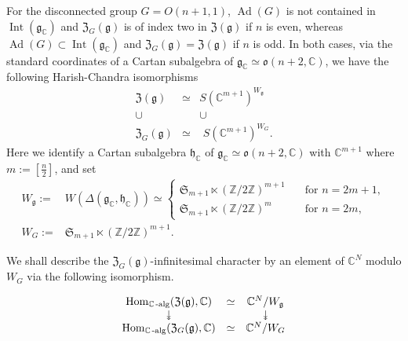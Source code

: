 For the disconnected group $G=O(n+1,1)$, 
 ${\operatorname{Ad}}(G)$ is not contained in ${\operatorname{Int}}({\mathfrak{g}}_{{\mathbb{C}}})$
 and ${\mathfrak{Z}}_G({\mathfrak{g}})$ is of index two in 
 ${\mathfrak{Z}}({\mathfrak{g}})$
if $n$ is even, 
 whereas ${\operatorname{Ad}}(G) \subset {\operatorname{Int}}({\mathfrak{g}}_{{\mathbb{C}}})$ and ${\mathfrak{Z}}_G({\mathfrak{g}})={\mathfrak{Z}}({\mathfrak{g}})$
 if $n$ is odd.  
In both cases,
 via the standard coordinates
 of a Cartan subalgebra of ${\mathfrak{g}}_{{\mathbb{C}}} \simeq {\mathfrak{o}}
(n+2,{{\mathbb{C}}})$, 
 we have the following
 Harish-Chandra isomorphisms
\begin{equation*}
\begin{array}{ccc}
   {\mathfrak{Z}}({\mathfrak{g}})
   & \simeq
   & S({{\mathbb{C}}}^{m+1})^{W_{\mathfrak{g}}}
\\
   \cup 
   & 
   & \cup
\\
  {\mathfrak{Z}}_G({\mathfrak{g}})
   & \simeq
   &\,\, S({{\mathbb{C}}}^{m+1})^{W_G}.  
\end{array}
\end{equation*}
Here  we identify a Cartan subalgebra ${\mathfrak{h}}_{{\mathbb{C}}}$
 of ${\mathfrak{g}}_{{\mathbb{C}}}\simeq {\mathfrak{o}}(n+2,{\mathbb{C}})$
 with ${{\mathbb{C}}}^{m+1}$
 where $m:=[\frac n 2]$, 
 and set 
\begin{align*}
W_{\mathfrak{g}}
:=& W(\Delta({\mathfrak{g}}_{\mathbb{C}},{\mathfrak{h}}_{\mathbb{C}}))
\simeq
\begin{cases}
{\mathfrak{S}}_{m+1} \ltimes ({\mathbb{Z}}/2 {\mathbb{Z}})^{m+1}
\quad
&\text{for $n=2m+1$}, 
\\
{\mathfrak{S}}_{m+1} \ltimes ({\mathbb{Z}}/2 {\mathbb{Z}})^{m}
\quad
&\text{for $n=2m$}, 
\end{cases}
\\
W_G:=& {\mathfrak{S}}_{m+1} \ltimes ({\mathbb{Z}}/2 {\mathbb{Z}})^{m+1}. 
\end{align*}

We shall describe
 the
 ${\mathfrak{Z}}_G({\mathfrak{g}})$-infinitesimal character
 by an element of ${{\mathbb{C}}}^N$ modulo $W_G$
 via the following isomorphism.  

\begin{equation}
\begin{array}{ccc}
    {\operatorname{Hom}}_{{\mathbb{C}}\operatorname{-alg}}({\mathfrak{Z}}({\mathfrak{g}}), {{\mathbb{C}}}) 
&\simeq 
&{\mathbb{C}}^N/W_{\mathfrak{g}}
\\
\rotatebox[origin=c]{-90}{$\twoheadrightarrow$}
&
&\rotatebox[origin=c]{-90}{$\twoheadrightarrow$}
\\
{\operatorname{Hom}}_{{\mathbb{C}}\operatorname{-alg}}({\mathfrak{Z}}_G({\mathfrak{g}}), {{\mathbb{C}}}) 
&\simeq 
&{\mathbb{C}}^N/W_G
\\
\label{eqn:HCpara}
\end{array}
\end{equation}

